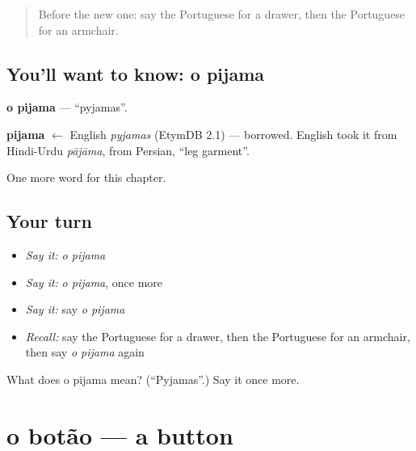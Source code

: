 \label{lesson:PT-C188-pijama}



\begin{quote}
Before the new one: say the Portuguese for a drawer, then the Portuguese for an armchair.
\end{quote}

\subsection*{You'll want to know: o pijama}
\textbf{o pijama} — \textquotedblleft{}pyjamas\textquotedblright{}.

\begin{cousinweb}
\textbf{pijama} $\leftarrow$ English \emph{pyjamas} (EtymDB 2.1) — borrowed. English took it from Hindi-Urdu \emph{pājāma}, from Persian, \textquotedblleft{}leg garment\textquotedblright{}.
\end{cousinweb}

\begin{grammarlens}[title={What you've built}]
One more word for this chapter.
\end{grammarlens}

\subsection*{Your turn}
\begin{itemize}
\raggedright
  \item \emph{Say it:} \emph{o pijama}
  \item \emph{Say it:} \emph{o pijama}, once more
  \item \emph{Say it:} say \emph{o pijama}
  \item \emph{Recall:} say the Portuguese for a drawer, then the Portuguese for an armchair, then say \emph{o pijama} again
\end{itemize}

\begin{tcolorbox}[breakable,colback=teal!4,colframe=teal!35!black,title={Before you move on}]
What does o pijama mean? (\textquotedblleft{}Pyjamas\textquotedblright{}.) Say it once more.
\end{tcolorbox}
\section[o botão]{o botão — a button}

\label{lesson:PT-C188-botao}



